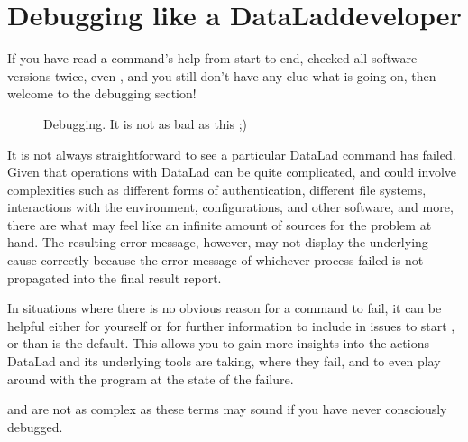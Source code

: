 \ignorespaces 

\section{Debugging like a DataLad\sphinxhyphen{}developer}
\label{\detokenize{basics/101-135-help:debugging-like-a-datalad-developer}}\label{\detokenize{basics/101-135-help:index-1}}
\sphinxAtStartPar
If you have read a command’s help from start to end, checked all software versions twice, even , and you still don’t have any clue what is going on, then welcome to the debugging section!

\begin{figure}[tbp]
\centering
\capstart

\noindent{}
\caption{Debugging. It is not as bad as this ;\sphinxhyphen{})}\label{\detokenize{basics/101-135-help:id4}}\end{figure}

\sphinxAtStartPar
It is not always straightforward to see  a particular DataLad command has failed.
Given that operations with DataLad can be quite complicated, and could involve complexities such as different forms of authentication, different file systems, interactions with the environment, configurations, and other software, and  more, there are what may feel like an infinite amount of sources for the problem at hand.
The resulting error message, however, may not display the underlying cause correctly because the error message of whichever process failed is not propagated into the final result report.

\sphinxAtStartPar
In situations where there is no obvious reason for a command to fail, it can be helpful \textendash{} either for yourself or for further information to include in {\hyperref[\detokenize{glossary:term-GitHub}]{}} issues \textendash{} to start , or  than is the default.
This allows you to gain more insights into the actions DataLad and its underlying tools are taking, where  they fail, and to even play around with the program at the state of the failure.

\sphinxAtStartPar
{\hyperref[\detokenize{glossary:term-debugging}]{}} and {\hyperref[\detokenize{glossary:term-logging}]{}} are not as complex as these terms may sound if you have never consciously debugged.

